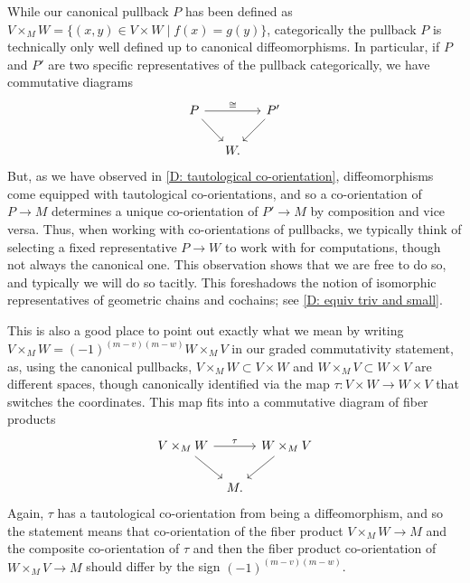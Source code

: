 \begin{remark}\label{R: pullback representative}
	While our canonical pullback $P$ has been defined as $V \times_M W = \{(x,y) \in V \times W \mid f(x) = g(y)\}$, categorically the pullback $P$ is technically only well defined up to canonical diffeomorphisms.
	In particular, if $P$ and $P'$ are two specific representatives of the pullback categorically, we have commutative diagrams
	\begin{equation*}
		\begin{tikzcd}[column sep=small]
			P \arrow[rr, "\cong"] \arrow[dr] & & P' \arrow[dl] \\
			& W. &
		\end{tikzcd}
	\end{equation*}
	But, as we have observed in \cref{D: tautological co-orientation}, diffeomorphisms come equipped with tautological co-orientations, and so a co-orientation of $P \to M$ determines a unique co-orientation of $P' \to M$ by composition and vice versa.
	Thus, when working with co-orientations of pullbacks, we typically think of selecting a fixed representative $P \to W$ to work with for computations, though not always the canonical one.
	This observation shows that we are free to do so, and typically we will do so tacitly.
	This foreshadows the notion of isomorphic representatives of geometric chains and cochains; see \cref{D: equiv triv and small}.
\end{remark}

\begin{remark}\label{R: precise commutativity}
	This is also a good place to point out exactly what we mean by writing $V \times_M W = (-1)^{(m-v)(m-w)}W \times_M V$ in our graded commutativity statement, as, using the canonical pullbacks, $V \times_M W \subset V \times W$ and $W \times_M V \subset W \times V$ are different spaces, though canonically identified via the map $\tau \colon V \times W \to W \times V$ that switches the coordinates.
	This map fits into a commutative diagram of fiber products
	\[
	\begin{tikzcd}[column sep=tiny]
		V \times_M W \arrow[rr, "\tau"] \arrow[dr] & & W \times_M V \arrow[dl] \\
		& M. &
	\end{tikzcd}
	\]
	Again, $\tau$ has a tautological co-orientation from being a diffeomorphism, and so the statement means that co-orientation of the fiber product $V \times_M W \to M$ and the composite co-orientation of $\tau$ and then the fiber product co-orientation of $W \times_M V \to M$ should differ by the sign $(-1)^{(m-v)(m-w)}$.
\end{remark}

